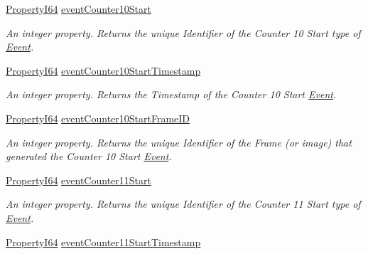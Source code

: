 \begin{DoxyCompactItemize}
\hyperlink{group___common_interface_ga81749b2696755513663492664a18a893}{Property\+I64} \hyperlink{classmv_i_m_p_a_c_t_1_1acquire_1_1_gen_i_cam_1_1_event_control_a4ed08e48d6498875164cb0aa473283c8}{event\+Counter10\+Start}
\begin{DoxyCompactList}\small\item\em An integer property. Returns the unique Identifier of the Counter 10 Start type of \hyperlink{classmv_i_m_p_a_c_t_1_1acquire_1_1_event}{Event}. \end{DoxyCompactList}\item 
\hyperlink{group___common_interface_ga81749b2696755513663492664a18a893}{Property\+I64} \hyperlink{classmv_i_m_p_a_c_t_1_1acquire_1_1_gen_i_cam_1_1_event_control_acc628cd17e1ade355bdf07709564d547}{event\+Counter10\+Start\+Timestamp}
\begin{DoxyCompactList}\small\item\em An integer property. Returns the Timestamp of the Counter 10 Start \hyperlink{classmv_i_m_p_a_c_t_1_1acquire_1_1_event}{Event}. \end{DoxyCompactList}\item 
\hyperlink{group___common_interface_ga81749b2696755513663492664a18a893}{Property\+I64} \hyperlink{classmv_i_m_p_a_c_t_1_1acquire_1_1_gen_i_cam_1_1_event_control_a0ff053420dd6f64aa50f904d4870731e}{event\+Counter10\+Start\+Frame\+I\+D}
\begin{DoxyCompactList}\small\item\em An integer property. Returns the unique Identifier of the Frame (or image) that generated the Counter 10 Start \hyperlink{classmv_i_m_p_a_c_t_1_1acquire_1_1_event}{Event}. \end{DoxyCompactList}\item 
\hyperlink{group___common_interface_ga81749b2696755513663492664a18a893}{Property\+I64} \hyperlink{classmv_i_m_p_a_c_t_1_1acquire_1_1_gen_i_cam_1_1_event_control_aae7e65741cc7d4e99445dc543d0243f7}{event\+Counter11\+Start}
\begin{DoxyCompactList}\small\item\em An integer property. Returns the unique Identifier of the Counter 11 Start type of \hyperlink{classmv_i_m_p_a_c_t_1_1acquire_1_1_event}{Event}. \end{DoxyCompactList}\item 
\hyperlink{group___common_interface_ga81749b2696755513663492664a18a893}{Property\+I64} \hyperlink{classmv_i_m_p_a_c_t_1_1acquire_1_1_gen_i_cam_1_1_event_control_ab5f60d9281a4aa8e94d808ed6192b530}{event\+Counter11\+Start\+Timestamp}

\end{DoxyCompactItemize}
